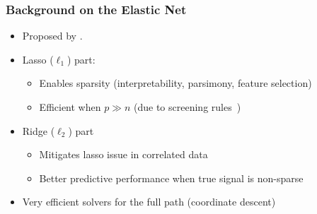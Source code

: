 \documentclass[10pt]{beamer}
\begin{document}
\begin{frame}[c]
  \frametitle{Background on the Elastic Net}

  \begin{itemize}
    \item<1-> Proposed by \textcite{zou2005}.
    \item<2-> Lasso (\(\ell_1\)) part:
          \begin{itemize}
            \item Enables sparsity (interpretability, parsimony, feature selection)
            \item Efficient when \(p \gg n\) (due to screening rules~\parencite{elghaoui2010,tibshirani2012})
          \end{itemize}
    \item<3-> Ridge (\(\ell_2\)) part
          \begin{itemize}
            \item Mitigates lasso issue in correlated data
            \item Better predictive performance when true signal is non-sparse
          \end{itemize}
    \item<4-> Very efficient solvers for the full path (coordinate descent)
  \end{itemize}
\end{frame}
\end{document}
